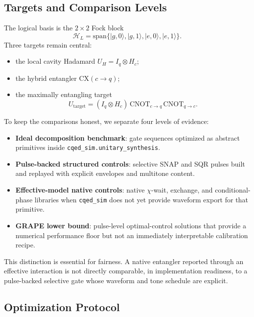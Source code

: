 \documentclass[11pt, a4paper]{article}
\begin{document}
\subsection{Targets and Comparison Levels}

The logical basis is the $2\times 2$ Fock block
\begin{equation}
\mathcal{H}_L = \mathrm{span}\{|g,0\rangle, |g,1\rangle, |e,0\rangle, |e,1\rangle\}.
\end{equation}
Three targets remain central:
\begin{itemize}
\item the local cavity Hadamard $U_H = I_q \otimes H_c$;
\item the hybrid entangler $\mathrm{CX}(c\!\to\! q)$;
\item the maximally entangling target
\begin{equation}
U_{\mathrm{target}} = (I_q \otimes H_c)\,\mathrm{CNOT}_{c\to q}\,\mathrm{CNOT}_{q\to c}.
\end{equation}
\end{itemize}

To keep the comparisons honest, we separate four levels of evidence:
\begin{itemize}
\item \textbf{Ideal decomposition benchmark}: gate sequences optimized as abstract primitives inside \texttt{cqed\_sim.unitary\_synthesis}.
\item \textbf{Pulse-backed structured controls}: selective SNAP and SQR pulses built and replayed with explicit envelopes and multitone content.
\item \textbf{Effective-model native controls}: native $\chi$-wait, exchange, and conditional-phase libraries when \texttt{cqed\_sim} does not yet provide waveform export for that primitive.
\item \textbf{GRAPE lower bound}: pulse-level optimal-control solutions that provide a numerical performance floor but not an immediately interpretable calibration recipe.
\end{itemize}

This distinction is essential for fairness. A native entangler reported through an effective interaction is not directly comparable, in implementation readiness, to a pulse-backed selective gate whose waveform and tone schedule are explicit.

\subsection{Optimization Protocol}
\end{document}
